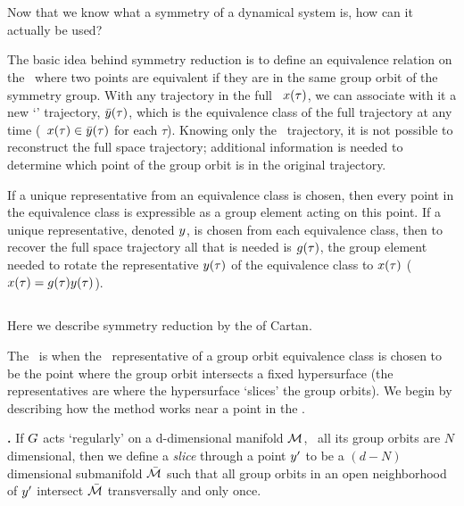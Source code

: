 {    \fi

\section{\Reducedsp}
\label{sect:reducedStateSp}

Now that we know what a symmetry of a dynamical system is, how can it actually be used?

The basic idea behind symmetry reduction is to define an equivalence relation on the \statesp\ where two points are equivalent if they are in the same group orbit of the symmetry group. With any trajectory in the full \statesp\, $x(\tau)$, we can associate with it a new `\reducedsp' trajectory, $\bar{y}(\tau)$, which is the equivalence class of the full trajectory at any time (\ie\ $x(\tau) \in \bar{y}(\tau)$ for each $\tau$). Knowing only the \reducedsp\ trajectory, it is not possible to reconstruct the full space trajectory; additional information is needed to determine which point of the group orbit is in the original trajectory.

If a unique representative from an equivalence class is chosen, then every point in the equivalence class is expressible as a group element acting on this point. If a unique representative, denoted $y$, is chosen from each equivalence class, then to recover the full space trajectory all that is needed is $g(\tau)$, the group element needed to rotate the representative $y(\tau)$ of the equivalence class to $x(\tau)$ (\ie\ $x(\tau)=g(\tau) y(\tau)$).


\subsection{\Mslices}
\label{sect:mslices}


Here we describe symmetry reduction by the
{\em {\mslices}} of
Cartan.

The \mslices\ is when the \reducedsp\ representative of a group orbit equivalence class is chosen to be the point where the group orbit intersects a fixed hypersurface (the representatives are where the hypersurface `slices' the group orbits). We begin by describing how the method works near a point in the \statesp.

\begin{definition}
\textbf{\Slice.}
If $G$ acts `regularly' on a d-dimensional manifold ${\cal M}$, \ie\ all its group orbits are $N$ dimensional, then we define a \emph{slice}  through a point ${y'}$ to be a $(d\!-\!N)$ dimensional submanifold $\bar{\cal M}$ such that all group orbits in an open neighborhood of ${y'}$ intersect $\bar{\cal M}$ transversally and only once.
\end{definition}

}
